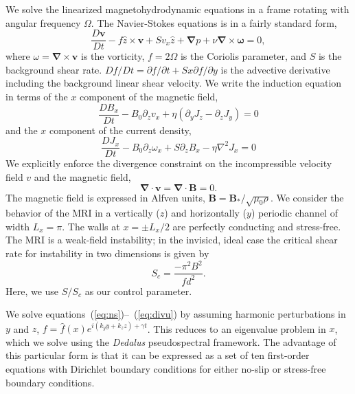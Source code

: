 \documentclass[aps,prl, reprint,superscriptaddress]{revtex4-1}
\newcommand{\SSC}{S/S_{c}}
\begin{document}
We solve the linearized magnetohydrodynamic equations in a frame rotating with angular frequency $\Omega$. The Navier-Stokes equations is in a fairly standard form,
\begin{equation}
  \label{eq:ns}
  \frac{D \mathbf{v}}{Dt} - f \hat{z} \times \mathbf{v} + S v_x \hat{z} + \mathbf{\nabla}{p} + \nu \mathbf{\nabla} \times \mathbf{\omega} = 0,
\end{equation}
where $\omega = \mathbf{\nabla} \times \mathbf{v}$ is the vorticity, $f = 2 \Omega$ is the Coriolis parameter, and $S$ is the background shear rate. $Df/Dt = \partial f/\partial t + S x \partial f/\partial y$ is the advective derivative including the background linear shear velocity.  We write the induction equation in terms of the $x$ component of the magnetic field,
\begin{equation}
  \label{eq:Bx}
  \frac{D B_x}{Dt} - B_0 \partial_z v_x + \eta (\partial_y J_z - \partial_z J_y) = 0
\end{equation}
and the $x$ component of the current density,
\begin{equation}
  \label{eq:Jx}
  \frac{D J_x}{Dt} - B_0 \partial_z \omega_x + S \partial_z B_x - \eta \nabla^2 J_x = 0
\end{equation}
We explicitly enforce the divergence constraint on the incompressible velocity field $v$ and the magnetic field,
\begin{equation}
  \label{eq:divu}
  \mathbf{\nabla} \cdot \mathbf{v} = \mathbf{\nabla} \cdot \mathbf{B} = 0.
\end{equation}
The magnetic field is expressed in Alfven units, $\mathbf{B} = \mathbf{B_*}/\sqrt{\mu_0 \rho}$.
We consider the behavior of the MRI in a vertically ($z$) and horizontally ($y$) periodic channel of width $L_x = \pi$. The walls at $x = \pm L_x/2$ are perfectly conducting and stress-free. The MRI is a weak-field instability; in the invisicd, ideal case the critical shear rate for instability in two dimensions is given by
\begin{equation}
  \label{eq:Sc}
  S_c = \frac{-\pi^2 B^2}{f d^2}.
\end{equation}
Here, we use $\SSC$ as our control parameter. 

We solve equations~(\ref{eq:ns})--~(\ref{eq:divu}) by assuming harmonic perturbations in $y$ and $z$, $f = \hat{f}(x) e^{i(k_y y + k_z z) + \gamma t}$. This reduces to an eigenvalue problem in $x$, which we solve using the \emph{Dedalus} pseudospectral framework. The advantage of this particular form is that it can be expressed as a set of ten first-order equations with Dirichlet boundary conditions for either no-slip or stress-free boundary conditions. 
\end{document}
